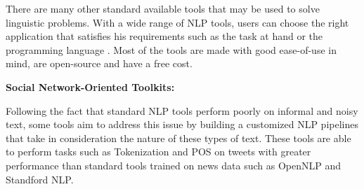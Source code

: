 There are many other standard available tools that may be used to solve linguistic problems. %
With a wide range of NLP tools, users can choose the right application that satisfies his requirements such as the task at hand or the programming language . Most of the tools are made with good ease-of-use in mind, are open-source and have a free cost.

\textbf{Social Network-Oriented Toolkits:}

Following the fact that standard NLP tools perform poorly on informal and noisy text, some tools aim to address this issue by building a customized NLP pipelines that take in consideration the nature of these types of text. These tools are able to perform tasks such as Tokenization and POS on tweets with greater performance than standard tools trained on news data such as OpenNLP and Standford NLP.


